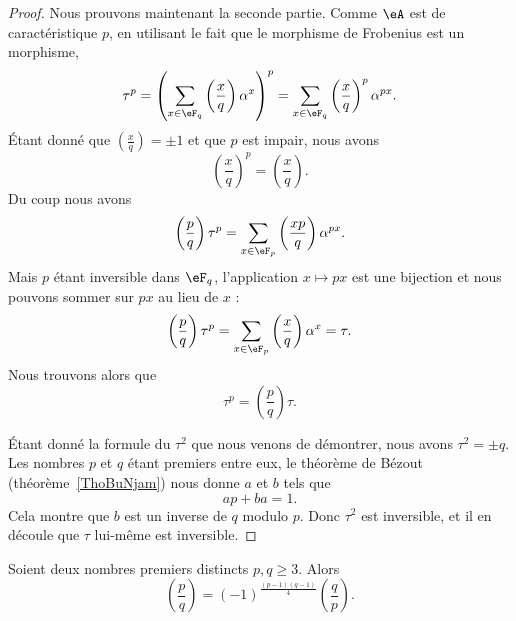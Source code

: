 \begin{proof}
	Nous prouvons maintenant la seconde partie. Comme \( \eA\) est de caractéristique \( p\), en utilisant le fait que le morphisme de Frobenius est un morphisme,
	\begin{equation}
		\tau^p=\left( \sum_{x\in \eF_q}\left(\frac{x}{q}\right)\alpha^x \right)^p=\sum_{x\in \eF_q}\left(\frac{x}{q}\right)^p\alpha^{px}.
	\end{equation}
	Étant donné que \( \left(\frac{x}{q}\right)=\pm 1\) et que \( p\) est impair, nous avons
	\begin{equation}
		\left(\frac{x}{q}\right)^p=\left(\frac{x}{q}\right).
	\end{equation}
	Du coup nous avons
	\begin{equation}
		\left(\frac{p}{q}\right)\tau^p=\sum_{x\in \eF_p}\left(\frac{xp}{q}\right)\alpha^{px}.
	\end{equation}
	Mais \( p\) étant inversible dans \( \eF_q\), l'application \( x\mapsto px\) est une bijection et nous pouvons sommer sur \( px\) au lieu de \( x\) :
	\begin{equation}
		\left(\frac{p}{q}\right)\tau^p=\sum_{x\in \eF_p}\left(\frac{x}{q}\right)\alpha^x=\tau.
	\end{equation}
	Nous trouvons alors que
	\begin{equation}
		\tau^p=\left(\frac{p}{q}\right)\tau.
	\end{equation}

	Étant donné la formule du \( \tau^2\) que nous venons de démontrer, nous avons \( \tau^2=\pm q\). Les nombres \( p\) et \( q\) étant premiers entre eux, le théorème de Bézout (théorème~\ref{ThoBuNjam}) nous donne \( a\) et \( b\) tels que
	\begin{equation}
		ap+ba=1.
	\end{equation}
	Cela montre que \( b\) est un inverse de \( q\) modulo \( p\). Donc \( \tau^2\) est inversible, et il en découle que \( \tau\) lui-même est inversible.
\end{proof}

\begin{theorem}  \label{ThoMiEiUm}
	Soient deux nombres premiers distincts \( p,q\geq 3\). Alors
	\begin{equation}
		\left(\frac{p}{q}\right)=(-1)^{\frac{ (p-1)(q-1) }{ 4 }}\left(\frac{q}{p}\right).
	\end{equation}
\end{theorem}

